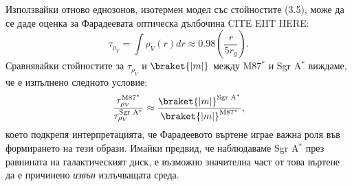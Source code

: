\noindent\begin{minipage}{22em}
	Използвайки отново еднозонов, изотермен модел със стойностите (3.5), може да се даде оценка за Фарадеевата оптическа дълбочина CITE EHT HERE:
	\begin{equation}
		\tau_{\rho_V} = \int \rho_{V}(r)dr\approx 0.98\left(\frac{r}{5r_g}\right).
	\end{equation}
	Сравнявайки стойностите за $\tau_{\rho_V}$ и $\braket{|m|}$ между M87$^*$ и Sgr A$^*$ виждаме, че е изпълнено следното условие:
	\begin{equation}
		\frac{\tau_{\rho_V}^{\text{M87}^*}}{\tau_{\rho_V}^{\text{Sgr A}^*}}\approx\frac{\braket{|m|}^{\text{Sgr A}^*}}{\braket{|m|}^{\text{M87}^*}},
	\end{equation}
	което подкрепя интерпретацията, че Фарадеевото въртене играе важна роля във формирането на тези образи. Имайки предвид, че наблюдаваме Sgr A$^*$ през равнината на галактическият диск, е възможно значителна част от това въртене да е причинено \emph{извън} излъчващата среда.
\end{minipage}$\,\,\,$
